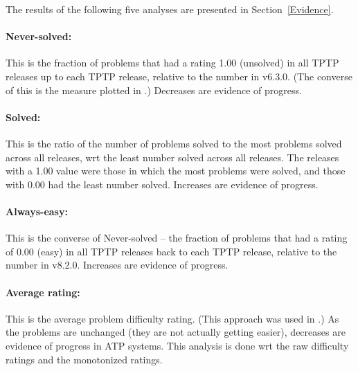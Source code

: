 \documentclass[runningheads]{llncs}
\begin{document}
\noindent
The results of the following five analyses are presented in Section~\ref{Evidence}.

\vspace*{-0.5em}
\paragraph{Never-solved:}
This is the fraction of problems that had a rating 1.00 (unsolved) in all TPTP releases 
up to each TPTP release, relative to the number in v6.3.0.
(The converse of this is the measure plotted in \cite{SSP21}.)
Decreases are evidence of progress.

\vspace*{-0.5em}
\paragraph{Solved:}
This is the ratio of the number of problems solved to the most problems solved across all 
releases, wrt the least number solved across all releases.
The releases with a 1.00 value were those in which the most problems were solved, and those with
0.00 had the least number solved.
Increases are evidence of progress.

\vspace*{-0.5em}
\paragraph{Always-easy:}
This is the converse of Never-solved -- the fraction of problems that had a rating of 
0.00 (easy) in all TPTP releases back to each TPTP release, relative to the number in v8.2.0.
Increases are evidence of progress.

\vspace*{-0.5em}
\paragraph{Average rating:}
This is the average problem difficulty rating.
(This approach was used in \cite{SFS01}.)
As the problems are unchanged (they are not actually getting easier), decreases are 
evidence of progress in ATP systems.
This analysis is done wrt the raw difficulty ratings and the monotonized ratings.
\end{document}
